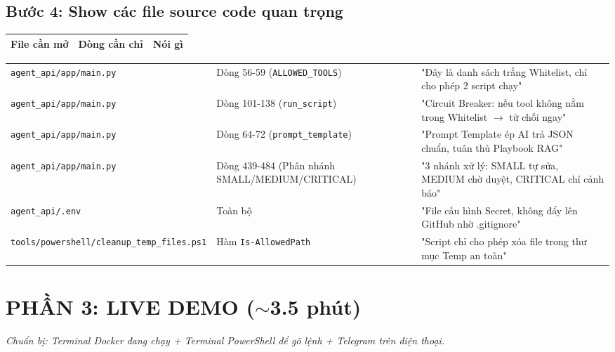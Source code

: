 \documentclass[12pt,a4paper]{article}
\begin{document}
\subsection{Bước 4: Show các file source code quan trọng}

\begin{longtable}{llp{7cm}}
\toprule
\textbf{File cần mở} & \textbf{Dòng cần chỉ} & \textbf{Nói gì} \\
\midrule
\end{longtable}
\begin{longtable}{p{4.5cm}p{4cm}p{7cm}}
\texttt{agent\_api/app/main.py} & Dòng 56-59 (\texttt{ALLOWED\_TOOLS}) & "Đây là danh sách trắng Whitelist, chỉ cho phép 2 script chạy" \\ \addlinespace
\texttt{agent\_api/app/main.py} & Dòng 101-138 (\texttt{run\_script}) & "Circuit Breaker: nếu tool không nằm trong Whitelist $\rightarrow$ từ chối ngay" \\ \addlinespace
\texttt{agent\_api/app/main.py} & Dòng 64-72 (\texttt{prompt\_template}) & "Prompt Template ép AI trả JSON chuẩn, tuân thủ Playbook RAG" \\ \addlinespace
\texttt{agent\_api/app/main.py} & Dòng 439-484 (Phân nhánh SMALL/MEDIUM/CRITICAL) & "3 nhánh xử lý: SMALL tự sửa, MEDIUM chờ duyệt, CRITICAL chỉ cảnh báo" \\ \addlinespace
\texttt{agent\_api/.env} & Toàn bộ & "File cấu hình Secret, không đẩy lên GitHub nhờ .gitignore" \\ \addlinespace
\texttt{tools/powershell/cleanup\_temp\_files.ps1} & Hàm \texttt{Is-AllowedPath} & "Script chỉ cho phép xóa file trong thư mục Temp an toàn" \\
\bottomrule
\end{longtable}

\newpage

\section{PHẦN 3: LIVE DEMO ($\sim$3.5 phút)}

\textit{Chuẩn bị: Terminal Docker đang chạy + Terminal PowerShell để gõ lệnh + Telegram trên điện thoại.}
\end{document}
